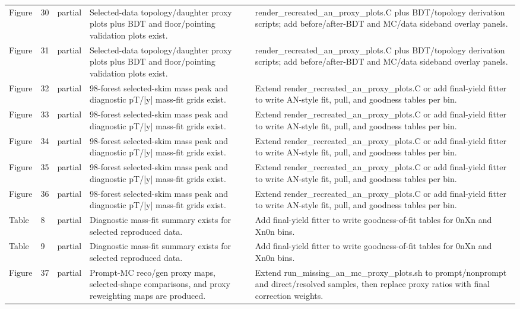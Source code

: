 \documentclass[11pt]{article}
\begin{document}
\begin{longtable}{lll p{} p{}}
Figure & 30 & partial & Selected-data topology/daughter proxy plots plus BDT and floor/pointing validation plots exist. & render\_recreated\_an\_proxy\_plots.C plus BDT/topology derivation scripts; add before/after-BDT and MC/data sideband overlay panels. \\
Figure & 31 & partial & Selected-data topology/daughter proxy plots plus BDT and floor/pointing validation plots exist. & render\_recreated\_an\_proxy\_plots.C plus BDT/topology derivation scripts; add before/after-BDT and MC/data sideband overlay panels. \\
Figure & 32 & partial & 98-forest selected-skim mass peak and diagnostic pT/|y| mass-fit grids exist. & Extend render\_recreated\_an\_proxy\_plots.C or add final-yield fitter to write AN-style fit, pull, and goodness tables per bin. \\
Figure & 33 & partial & 98-forest selected-skim mass peak and diagnostic pT/|y| mass-fit grids exist. & Extend render\_recreated\_an\_proxy\_plots.C or add final-yield fitter to write AN-style fit, pull, and goodness tables per bin. \\
Figure & 34 & partial & 98-forest selected-skim mass peak and diagnostic pT/|y| mass-fit grids exist. & Extend render\_recreated\_an\_proxy\_plots.C or add final-yield fitter to write AN-style fit, pull, and goodness tables per bin. \\
Figure & 35 & partial & 98-forest selected-skim mass peak and diagnostic pT/|y| mass-fit grids exist. & Extend render\_recreated\_an\_proxy\_plots.C or add final-yield fitter to write AN-style fit, pull, and goodness tables per bin. \\
Figure & 36 & partial & 98-forest selected-skim mass peak and diagnostic pT/|y| mass-fit grids exist. & Extend render\_recreated\_an\_proxy\_plots.C or add final-yield fitter to write AN-style fit, pull, and goodness tables per bin. \\
Table & 8 & partial & Diagnostic mass-fit summary exists for selected reproduced data. & Add final-yield fitter to write goodness-of-fit tables for 0nXn and Xn0n bins. \\
Table & 9 & partial & Diagnostic mass-fit summary exists for selected reproduced data. & Add final-yield fitter to write goodness-of-fit tables for 0nXn and Xn0n bins. \\
Figure & 37 & partial & Prompt-MC reco/gen proxy maps, selected-shape comparisons, and proxy reweighting maps are produced. & Extend run\_missing\_an\_mc\_proxy\_plots.sh to prompt/nonprompt and direct/resolved samples, then replace proxy ratios with final correction weights. \\

\end{longtable}
\end{document}
